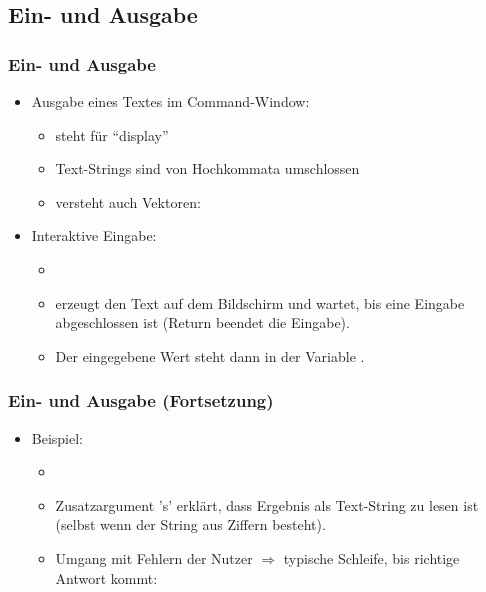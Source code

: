   \subsection{Ein- und Ausgabe}
  \begin{frame}
      \frametitle{Ein- und Ausgabe}
      \begin{itemize}
          \item Ausgabe eines Textes im Command-Window:
            \begin{itemize}
                \item {} steht für ``display''
                \item Text-Strings sind von Hochkommata umschlossen
                \item {} versteht auch Vektoren: 
            \end{itemize}
          \item Interaktive Eingabe:
          \begin{itemize}
              \item {} 
              \item erzeugt den Text auf dem Bildschirm und wartet, bis eine Eingabe abgeschlossen ist (Return beendet die Eingabe).
              \item Der eingegebene Wert steht dann in der Variable .
          \end{itemize}
      \end{itemize}
  \end{frame}

  \begin{frame}
      \frametitle{Ein- und Ausgabe (Fortsetzung)}
      \begin{itemize}
          \item Beispiel:
          \begin{itemize}
              \item {}
              \item Zusatzargument 's' erklärt, dass Ergebnis als Text-String zu lesen ist (selbst wenn der String aus Ziffern besteht).
              \item Umgang mit Fehlern der Nutzer $\Rightarrow$ typische Schleife, bis richtige Antwort kommt:
          \end{itemize}
          
      \end{itemize}
  \end{frame}


